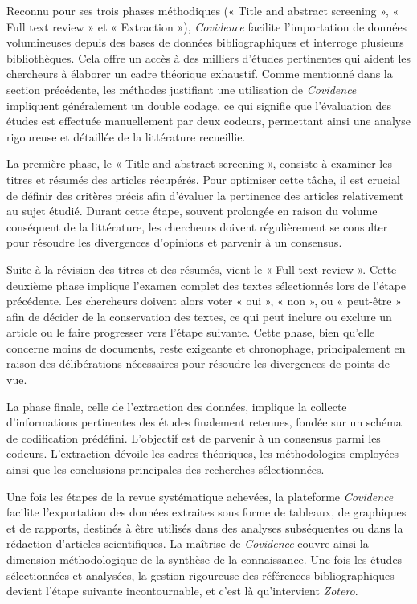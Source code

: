 \documentclass[
  letterpaper,
  DIV=11,
  numbers=noendperiod,
  oneside]{scrreprt}
\begin{document}
Reconnu pour ses trois phases méthodiques (« Title and abstract
screening », « Full text review » et « Extraction »), \emph{Covidence}
facilite l'importation de données volumineuses depuis des bases de
données bibliographiques et interroge plusieurs bibliothèques. Cela
offre un accès à des milliers d'études pertinentes qui aident les
chercheurs à élaborer un cadre théorique exhaustif. Comme mentionné dans
la section précédente, les méthodes justifiant une utilisation de
\emph{Covidence} impliquent généralement un double codage, ce qui
signifie que l'évaluation des études est effectuée manuellement par deux
codeurs, permettant ainsi une analyse rigoureuse et détaillée de la
littérature recueillie.

La première phase, le « Title and abstract screening », consiste à
examiner les titres et résumés des articles récupérés. Pour optimiser
cette tâche, il est crucial de définir des critères précis afin
d'évaluer la pertinence des articles relativement au sujet étudié.
Durant cette étape, souvent prolongée en raison du volume conséquent de
la littérature, les chercheurs doivent régulièrement se consulter pour
résoudre les divergences d'opinions et parvenir à un consensus.

Suite à la révision des titres et des résumés, vient le « Full text
review ». Cette deuxième phase implique l'examen complet des textes
sélectionnés lors de l'étape précédente. Les chercheurs doivent alors
voter « oui », « non », ou « peut-être » afin de décider de la
conservation des textes, ce qui peut inclure ou exclure un article ou le
faire progresser vers l'étape suivante. Cette phase, bien qu'elle
concerne moins de documents, reste exigeante et chronophage,
principalement en raison des délibérations nécessaires pour résoudre les
divergences de points de vue.

La phase finale, celle de l'extraction des données, implique la collecte
d'informations pertinentes des études finalement retenues, fondée sur un
schéma de codification prédéfini. L'objectif est de parvenir à un
consensus parmi les codeurs. L'extraction dévoile les cadres théoriques,
les méthodologies employées ainsi que les conclusions principales des
recherches sélectionnées.

Une fois les étapes de la revue systématique achevées, la plateforme
\emph{Covidence} facilite l'exportation des données extraites sous forme
de tableaux, de graphiques et de rapports, destinés à être utilisés dans
des analyses subséquentes ou dans la rédaction d'articles scientifiques.
La maîtrise de \emph{Covidence} couvre ainsi la dimension méthodologique
de la synthèse de la connaissance. Une fois les études sélectionnées et
analysées, la gestion rigoureuse des références bibliographiques devient
l'étape suivante incontournable, et c'est là qu'intervient
\emph{Zotero}.
\end{document}

